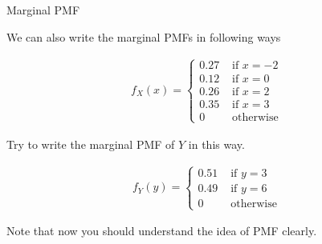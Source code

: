 \documentclass[8pt, usepdftitle=false]{beamer}
\begin{document}
\begin{frame}{Marginal PMF}


We can also write the marginal PMFs in following ways

\begin{align*}
  f_{X}(x)= \begin{cases} 0.27 & \text { if } x=-2 \\ 
  0.12 & \text { if } x=0 \\ 
  0.26 & \text { if } x=2 \\ 
  0.35 & \text { if } x=3 \\ 
  0 & \text { otherwise }\end{cases}
\end{align*}

Try to write the marginal PMF of $Y$ in this way. 

\begin{align*}
  f_{Y}(y)= \begin{cases} 0.51 & \text { if } y=3 \\ 
  0.49 & \text { if } y=6 \\ 
  0 & \text { otherwise }\end{cases}
\end{align*}

Note that now you should understand the idea of PMF clearly.


\end{frame}
\end{document}
